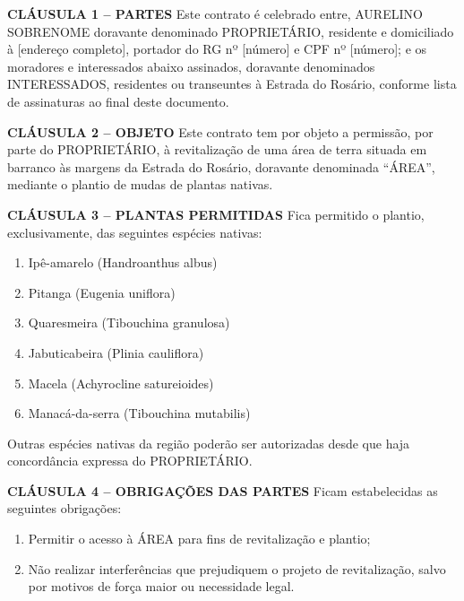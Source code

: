 \documentclass[12pt]{article}
\newcommand{\artigo}[1]{\vspace{1.0em}\noindent\textbf{#1}\hspace{0.75em}}
\newcommand{\paragrafo}[1]{\vspace{1.0em}\noindent{#1}\hspace{0.75em}}
\newcommand{\titulo}[1]{\begin{center}\fontsize{18}{22}\fontseries{b}\selectfont{#1\\[1.0em]}\end{center}}
\newcommand{\subtitulo}[1]{\begin{center}\fontsize{16}{17}\fontseries{m}\selectfont{#1\\[0.5em]}\end{center}}
\begin{document}
\titulo{CONTRATO DE REVITALIZAÇÃO DE ÁREA}
\subtitulo{Portal da Estrada Parque do Rosário}


\artigo{CLÁUSULA 1 – PARTES} Este contrato é celebrado entre, AURELINO SOBRENOME doravante denominado PROPRIETÁRIO, residente e domiciliado à [endereço completo], portador do RG nº [número] e CPF nº [número]; e os moradores e interessados abaixo assinados, doravante denominados INTERESSADOS, residentes ou transeuntes à Estrada do Rosário, conforme lista de assinaturas ao final deste documento.

\artigo{CLÁUSULA 2 – OBJETO} Este contrato tem por objeto a permissão, por parte do PROPRIETÁRIO, à revitalização de uma área de terra situada em barranco às margens da Estrada do Rosário, doravante denominada “ÁREA”, mediante o plantio de mudas de plantas nativas.

\artigo{CLÁUSULA 3 – PLANTAS PERMITIDAS} Fica permitido o plantio, exclusivamente, das seguintes espécies nativas:

\begin{enumerate}[label=\alph*), itemsep=0pt, parsep=0pt]
  \item Ipê-amarelo (Handroanthus albus)
  \item Pitanga (Eugenia uniflora)
  \item Quaresmeira (Tibouchina granulosa)
  \item Jabuticabeira (Plinia cauliflora)
  \item Macela (Achyrocline satureioides)
  \item Manacá-da-serra (Tibouchina mutabilis)
\end{enumerate}

\paragrafo{§ ÚNICO} Outras espécies nativas da região poderão ser autorizadas desde que haja concordância expressa do PROPRIETÁRIO.

\artigo{CLÁUSULA 4 – OBRIGAÇÕES DAS PARTES} Ficam estabelecidas as seguintes obrigações:

\paragrafo{Do Proprietário:}
\begin{enumerate}[label=\alph*), itemsep=0pt, parsep=0pt]
\item Permitir o acesso à ÁREA para fins de revitalização e plantio;  
\item Não realizar interferências que prejudiquem o projeto de revitalização, salvo por motivos de força maior ou necessidade legal.
\end{enumerate}
\end{document}
